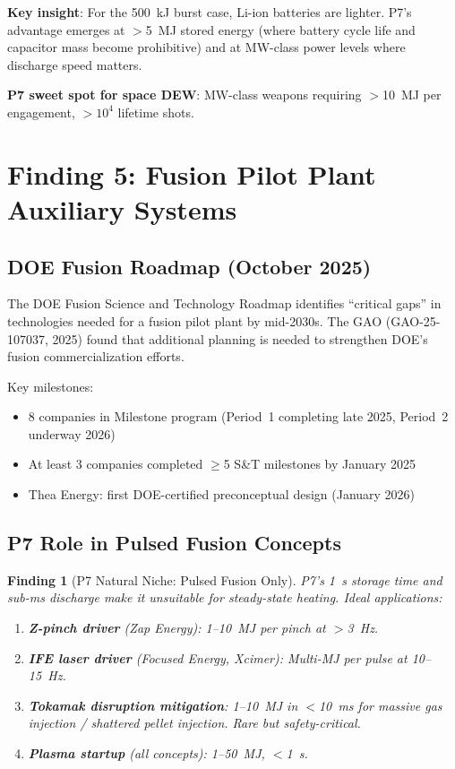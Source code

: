 \documentclass[11pt]{article}
\newtheorem{finding}{Finding}
\begin{document}
\textbf{Key insight}: For the 500~kJ burst case, Li-ion batteries
are lighter. P7's advantage emerges at $>$5~MJ stored energy
(where battery cycle life and capacitor mass become prohibitive)
and at MW-class power levels where discharge speed matters.

\textbf{P7 sweet spot for space DEW}: MW-class weapons
requiring $>$10~MJ per engagement, $>10^4$ lifetime shots.

\section{Finding 5: Fusion Pilot Plant Auxiliary Systems}
\label{sec:fpp}

\subsection{DOE Fusion Roadmap (October 2025)}

The DOE Fusion Science and Technology Roadmap identifies ``critical
gaps'' in technologies needed for a fusion pilot plant by mid-2030s.
The GAO (GAO-25-107037, 2025) found that additional planning is
needed to strengthen DOE's fusion commercialization efforts.

Key milestones:
\begin{itemize}[nosep]
  \item 8 companies in Milestone program (Period~1 completing
    late 2025, Period~2 underway 2026)
  \item At least 3 companies completed $\geq$5 S\&T milestones
    by January 2025
  \item Thea Energy: first DOE-certified preconceptual design
    (January 2026)
\end{itemize}

\subsection{P7 Role in Pulsed Fusion Concepts}

\begin{finding}[P7 Natural Niche: Pulsed Fusion Only]
\label{find:fpp-niche}
P7's 1~s storage time and sub-ms discharge make it unsuitable
for steady-state heating. Ideal applications:
\begin{enumerate}[nosep]
  \item \textbf{Z-pinch driver} (Zap Energy): 1--10~MJ per pinch
    at $>$3~Hz.
  \item \textbf{IFE laser driver} (Focused Energy, Xcimer):
    Multi-MJ per pulse at 10--15~Hz.
  \item \textbf{Tokamak disruption mitigation}: 1--10~MJ
    in $<$10~ms for massive gas injection / shattered pellet
    injection. Rare but safety-critical.
  \item \textbf{Plasma startup} (all concepts): 1--50~MJ, $<$1~s.
\end{enumerate}
\end{finding}
\end{document}
